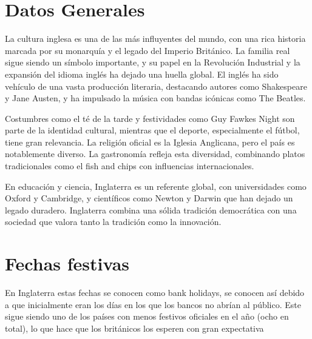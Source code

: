 \documentclass[letterpaper, 12pt]{article}
\begin{document}
\section*{Datos Generales}

La cultura inglesa es una de las más influyentes del mundo, con una rica
historia marcada por su monarquía y el legado del Imperio Británico. La familia
real sigue siendo un símbolo importante, y su papel en la Revolución Industrial
y la expansión del idioma inglés ha dejado una huella global. El inglés ha sido
vehículo de una vasta producción literaria, destacando autores como Shakespeare
y Jane Austen, y ha impulsado la música con bandas icónicas como The Beatles.

Costumbres como el té de la tarde y festividades como Guy Fawkes Night son
parte de la identidad cultural, mientras que el deporte, especialmente el
fútbol, tiene gran relevancia. La religión oficial es la Iglesia Anglicana,
pero el país es notablemente diverso. La gastronomía refleja esta diversidad,
combinando platos tradicionales como el fish and chips con influencias
internacionales.

En educación y ciencia, Inglaterra es un referente global, con universidades
como Oxford y Cambridge, y científicos como Newton y Darwin que han dejado un
legado duradero. Inglaterra combina una sólida tradición democrática con una
sociedad que valora tanto la tradición como la innovación.

\section*{Fechas festivas}

En Inglaterra estas fechas se conocen como bank holidays, se conocen así debido
a que inicialmente eran los días en los que los bancos no abrían al público.
Este sigue siendo uno de los países con menos festivos oficiales en el año
(ocho en total), lo que hace que los británicos los esperen con gran
expectativa
\end{document}
